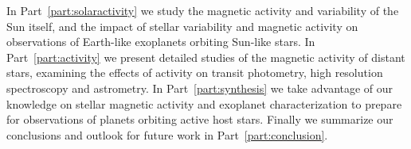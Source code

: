In Part~\ref{part:solaractivity} we study the magnetic activity and variability of the Sun itself, and the impact of stellar variability and magnetic activity on observations of Earth-like exoplanets orbiting Sun-like stars. In Part~\ref{part:activity} we present detailed studies of the magnetic activity of distant stars, examining the effects of activity on transit photometry, high resolution spectroscopy and astrometry. %
In Part~\ref{part:synthesis} we take advantage of our knowledge on stellar magnetic activity and exoplanet characterization to prepare for observations of planets orbiting active host stars. Finally we summarize our conclusions and outlook for future work in Part~\ref{part:conclusion}. 
